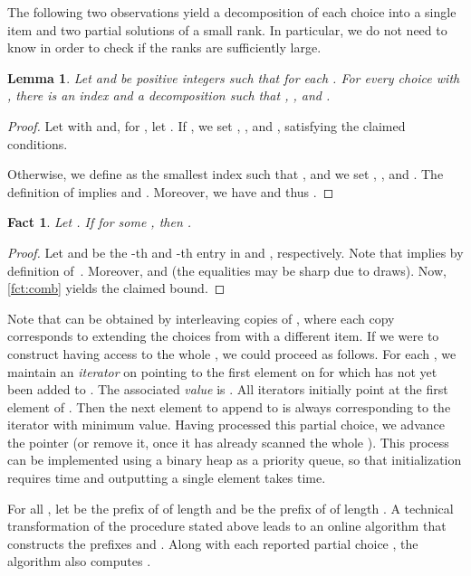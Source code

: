 \documentclass{article}
\theoremstyle{plain}
\newtheorem{lemma}[theorem]{Lemma}
\newtheorem{fact}[theorem]{Fact}
\theoremstyle{definition}
\begin{document}
The following two observations yield a decomposition of each choice into a single item and two partial solutions of a small rank.
  In particular, we do not need to know  in order to check if the ranks are sufficiently large.
  
  \begin{lemma}\label{lem:decomp}
  Let  and  be positive integers such that  for each .
  For every choice  with , there is an index  and a decomposition 
  such that , , and .
  \end{lemma}
  \begin{proof}
    Let  with  and, for , let .
    If , we set , , and , satisfying the claimed conditions.
    
    Otherwise, we define  as the smallest index  such that ,
    and we set , , and .
    The definition of  implies  and .
    Moreover, we have 
    and thus . \end{proof}
  
  \begin{fact}\label{fct:bound}
  Let .
  If  for some , then .
  \end{fact}
  \begin{proof}
  Let  and  be the -th and -th entry in  and , respectively.
  Note that  implies
   by definition of~.
  Moreover,  and 
  (the equalities may be sharp due to draws).
  Now, \cref{fct:comb} yields the claimed bound.
  \end{proof}

   Note that  can be obtained by interleaving  copies of , where each copy corresponds
  to extending the choices from  with a different item.
  If we were to construct  having access to the whole , we could proceed as follows.
  For each , we maintain an \emph{iterator} on 
  pointing to the first element  on  for which  has not yet been added to .
  The associated \emph{value} is .
  All iterators initially point at the first element of . 
  Then the next element to append to  is always  corresponding to the iterator with minimum value. 
  Having processed this partial choice, we advance the pointer (or remove it, once it has already scanned the whole ).
  This process can be implemented using a binary heap  as a priority queue,
  so that initialization requires  time and outputting a single element takes  time.

  For all , let  be the prefix of  of length  and  be the prefix of  of length .
  A technical transformation of the procedure stated above
  leads to an online algorithm that constructs the prefixes  and .
  Along with each reported partial choice , the algorithm also computes .
  
\end{document}
